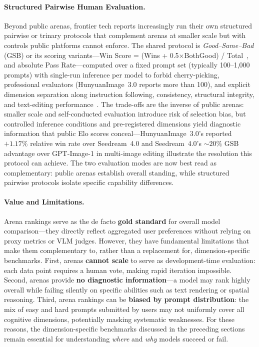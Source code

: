 \paragraph{Structured Pairwise Human Evaluation.} Beyond public arenas, frontier tech reports increasingly run their own structured pairwise or trinary protocols that complement arenas at smaller scale but with controls public platforms cannot enforce. The shared protocol is \emph{Good--Same--Bad} (GSB) or its scoring variants---Win Score = (Wins + 0.5$\times$BothGood) / Total~\citep{mao2026wan}, and absolute Pass Rate---computed over a fixed prompt set (typically 100--1{,}000 prompts) with single-run inference per model to forbid cherry-picking, professional evaluators (HunyuanImage~3.0 reports more than 100), and explicit dimension separation along instruction following, consistency, structural integrity, and text-editing performance~\citep{cao2025hunyuanimage, seedream2025seedream, team2025longcat, team2026firered, mao2026wan}. The trade-offs are the inverse of public arenas: smaller scale and self-conducted evaluation introduce risk of selection bias, but controlled inference conditions and pre-registered dimensions yield diagnostic information that public Elo scores conceal---HunyuanImage~3.0's reported $+1.17\%$ relative win rate over Seedream~4.0 and Seedream~4.0's $\sim$$20\%$ GSB advantage over GPT-Image-1 in multi-image editing illustrate the resolution this protocol can achieve. The two evaluation modes are now best read as complementary: public arenas establish overall standing, while structured pairwise protocols isolate specific capability differences.

\paragraph{Value and Limitations.} Arena rankings serve as the de facto \textbf{gold standard} for overall model comparison---they directly reflect aggregated user preferences without relying on proxy metrics or VLM judges. However, they have fundamental limitations that make them complementary to, rather than a replacement for, dimension-specific benchmarks. First, arenas \textbf{cannot scale} to serve as development-time evaluation: each data point requires a human vote, making rapid iteration impossible. Second, arenas provide \textbf{no diagnostic information}---a model may rank highly overall while failing silently on specific abilities such as text rendering or spatial reasoning. Third, arena rankings can be \textbf{biased by prompt distribution}: the mix of easy and hard prompts submitted by users may not uniformly cover all cognitive dimensions, potentially masking systematic weaknesses. For these reasons, the dimension-specific benchmarks discussed in the preceding sections remain essential for understanding \emph{where} and \emph{why} models succeed or fail.

